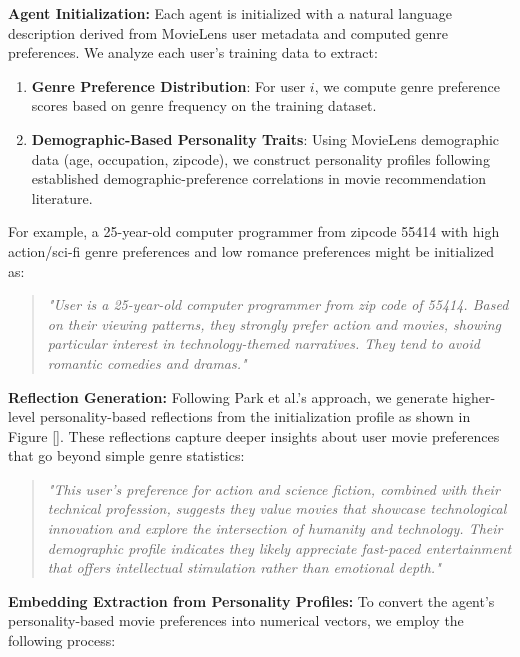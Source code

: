 \documentclass[acmsmall]{acmart}
\begin{document}
\textbf{Agent Initialization:} Each agent is initialized with a natural language description derived from MovieLens user metadata and computed genre preferences. We analyze each user's training data to extract:

\begin{enumerate}
    \item \textbf{Genre Preference Distribution}: For user $i$, we compute genre preference scores based on genre frequency on the training dataset.
    
    \item \textbf{Demographic-Based Personality Traits}: Using MovieLens demographic data (age, occupation, zipcode), we construct personality profiles following established demographic-preference correlations in movie recommendation literature.
\end{enumerate}

For example, a 25-year-old computer programmer from zipcode 55414 with high action/sci-fi genre preferences and low romance preferences might be initialized as:
\begin{quote}
\textit{"User is a 25-year-old computer programmer from zip code of 55414. Based on their viewing patterns, they strongly prefer action and movies, showing particular interest in technology-themed narratives. They tend to avoid romantic comedies and dramas."}
\end{quote}

\textbf{Reflection Generation:} Following Park et al.'s approach, we generate higher-level personality-based reflections from the initialization profile as shown in Figure \ref{}. These reflections capture deeper insights about user movie preferences that go beyond simple genre statistics:

\begin{quote}
\textit{"This user's preference for action and science fiction, combined with their technical profession, suggests they value movies that showcase technological innovation and explore the intersection of humanity and technology. Their demographic profile indicates they likely appreciate fast-paced entertainment that offers intellectual stimulation rather than emotional depth."}
\end{quote}

\textbf{Embedding Extraction from Personality Profiles:} To convert the agent's personality-based movie preferences into numerical vectors, we employ the following process:
\end{document}
